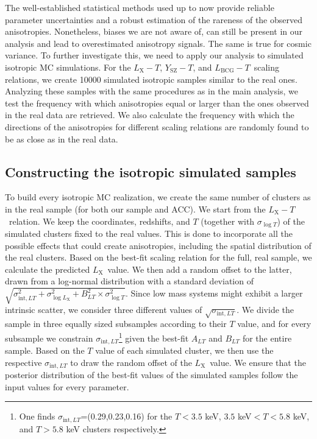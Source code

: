 \documentclass{aa}   %
\newcommand{\LT}{$L_{\text{X}}-T$}
\newcommand{\YT}{$Y_{\text{SZ}}-T$}
\newcommand{\LbcgT}{$L_{\text{BCG}}-T$}
\newcommand{\Lx}{$L_{\text{X}}$}
\begin{document}
The well-established statistical methods used up to now provide reliable parameter uncertainties and a robust estimation of the rareness of the observed anisotropies. Nonetheless, biases we are not aware of, can still be present in our analysis and lead to overestimated anisotropy signals. The same is true for cosmic variance. To further investigate this, we need to apply our analysis to simulated isotropic MC simulations. For the \LT, \YT, and \LbcgT\ scaling relations, we create 10000 simulated isotropic samples similar to the real ones. Analyzing these samples with the same procedures as in the main analysis, we test the frequency with which anisotropies equal or larger than the ones observed in the real data are retrieved. We also calculate the frequency with which the directions of the anisotropies for different scaling relations are randomly found to be as close as in the real data.

\subsection{Constructing the isotropic simulated samples}

To build every isotropic MC realization, we create the same number of clusters as in the real sample (for both our sample and ACC). We start from the \LT\ relation. We keep the coordinates, redshifts, and $T$ (together with $\sigma_{\log{T}}$) of the simulated clusters fixed to the real values. This is done to incorporate all the possible effects that could create anisotropies, including the spatial distribution of the real clusters. Based on the best-fit scaling relation for the full, real sample, we calculate the predicted \Lx\ value. We then add a random offset to the latter, drawn from a log-normal distribution with a standard deviation of $\sqrt{\sigma_{\text{int},LT}^2+\sigma _{\log{L_{\text{X}}}}^2+B_{LT}^2\times \sigma _{\log{T}}^2}$. Since low mass systems might exhibit a larger intrinsic scatter, we consider three different values of $\sqrt{\sigma_{\text{int},LT}}$. We divide the sample in three equally sized subsamples according to their $T$ value, and for every subsample we constrain $\sigma_{\text{int},LT}$\footnote{One finds  $\sigma_{\text{int},LT}$=(0.29,0.23,0.16) for the $T<3.5$ keV, $3.5$ keV$<T<5.8$ keV, and $T>5.8$ keV clusters respectively.} given the best-fit $A_{LT}$ and $B_{LT}$ for the entire sample. Based on the $T$ value of each simulated cluster, we then use the respective $\sigma_{\text{int},LT}$ to draw the random offset of the \Lx\ value. We ensure that the posterior distribution of the best-fit values of the simulated samples follow the input values for every parameter. 
\end{document}
